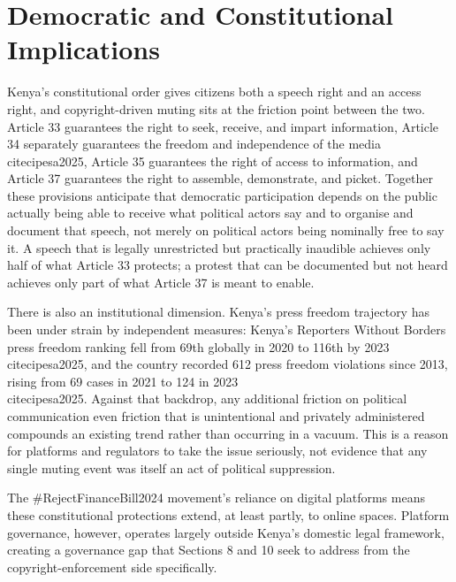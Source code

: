 \documentclass{article}
\begin{document}
\section{Democratic and Constitutional Implications}
\par 
Kenya’s constitutional order gives citizens both a speech right and an access right, and copyright-driven muting sits at the friction point between the two. Article 33 guarantees the right to seek, receive, and impart information, Article 34 separately guarantees the freedom and independence of the media \\cite{cipesa2025}, Article 35 guarantees the right of access to information, and Article 37 guarantees the right to assemble, demonstrate, and picket. Together these provisions anticipate that democratic participation depends on the public actually being able to receive what political actors say and to organise and document that speech, not merely on political actors being nominally free to say it. A speech that is legally unrestricted but practically inaudible achieves only half of what Article 33 protects; a protest that can be documented but not heard achieves only part of what Article 37 is meant to enable.
\par 
There is also an institutional dimension. Kenya’s press freedom trajectory has been under strain by independent measures: Kenya’s Reporters Without Borders press freedom ranking fell from 69th globally in 2020 to 116th by 2023 \\cite{cipesa2025}, and the country recorded 612 press freedom violations since 2013, rising from 69 cases in 2021 to 124 in 2023 \\cite{cipesa2025}. Against that backdrop, any additional friction on political communication even friction that is unintentional and privately administered compounds an existing trend rather than occurring in a vacuum. This is a reason for platforms and regulators to take the issue seriously, not evidence that any single muting event was itself an act of political suppression.
\par
The \#RejectFinanceBill2024 movement’s reliance on digital platforms means these constitutional protections extend, at least partly, to online spaces. Platform governance, however, operates largely outside Kenya’s domestic legal framework, creating a governance gap that Sections 8 and 10 seek to address from the copyright-enforcement side specifically.
\end{document}
